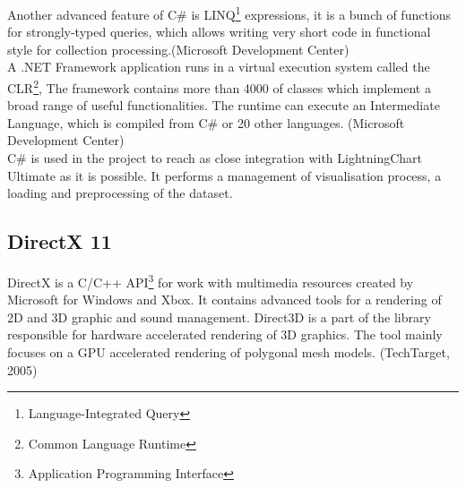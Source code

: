 \documentclass[twoside, english, 11pt]{report}
\begin{document}
Another advanced feature of C\# is  LINQ\footnote{Language-Integrated Query} expressions, it is a bunch of functions for strongly-typed queries, which allows writing very short code in functional style for collection processing.(Microsoft Development Center)\\

A .NET Framework application runs in a virtual execution system called the CLR\footnote{Common Language Runtime}, The framework contains more than 4000 of classes which implement a broad range of useful functionalities. The runtime can execute an Intermediate Language, which is compiled from C\# or 20 other languages. (Microsoft Development Center)\\

C\# is used in the project to reach as close integration with LightningChart Ultimate as it is possible. It performs a management of visualisation process, a loading and preprocessing of the dataset.

\subsection{DirectX 11}
DirectX is a C/C++ API\footnote{Application Programming Interface} for work with multimedia resources created by Microsoft for Windows and Xbox. It contains advanced tools for a rendering of 2D and 3D graphic and sound management. Direct3D is a part of the library responsible for hardware accelerated rendering of 3D graphics. The tool mainly focuses on a GPU accelerated rendering of polygonal mesh models. (TechTarget, 2005)\\
\end{document}

